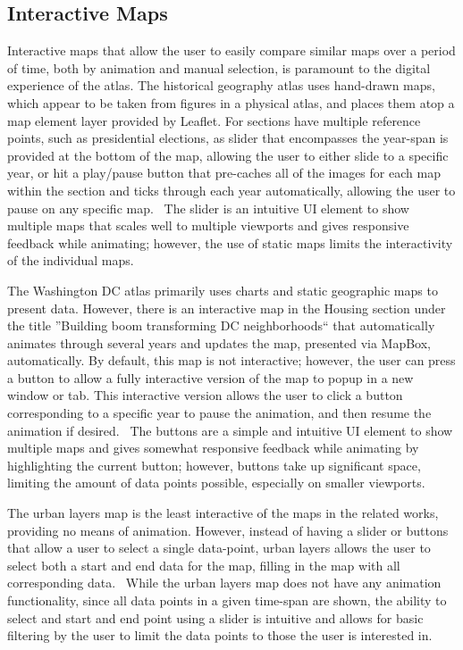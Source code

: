 \documentclass[11pt, draftcls, conference, onecolumn]{IEEEtran}
\begin{document}
\subsection{Interactive Maps}
Interactive maps that allow the user to easily compare similar maps over a period of time, both by animation and manual selection, is paramount to the digital experience of the atlas. The historical geography atlas uses hand-drawn maps, which appear to be taken from figures in a physical atlas, and places them atop a map element layer provided by Leaflet. For sections have multiple reference points, such as presidential elections, as slider that encompasses the year-span is provided at the bottom of the map, allowing the user to either slide to a specific year, or hit a play/pause button that pre-caches all of the images for each map within the section and ticks through each year automatically, allowing the user to pause on any specific map.~\cite{us-historical-atlas-2014} The slider is an intuitive UI element to show multiple maps that scales well to multiple viewports and gives responsive feedback while animating; however, the use of static maps limits the interactivity of the individual maps.

The Washington DC atlas primarily uses charts and static geographic maps to present data. However, there is an interactive map in the Housing section under the title ''Building boom transforming DC neighborhoods`` that automatically animates through several years and updates the map, presented via MapBox, automatically. By default, this map is not interactive; however, the user can press a button to allow a fully interactive version of the map to popup in a new window or tab. This interactive version allows the user to click a button corresponding to a specific year to pause the animation, and then resume the animation if desired.~\cite{dc-changing-2014} The buttons are a simple and intuitive UI element to show multiple maps and gives somewhat responsive feedback while animating by highlighting the current button; however, buttons take up significant space, limiting the amount of data points possible, especially on smaller viewports.

The urban layers map is the least interactive of the maps in the related works, providing no means of animation. However, instead of having a slider or buttons that allow a user to select a single data-point, urban layers allows the user to select both a start and end data for the map, filling in the map with all corresponding data.~\cite{urban-layers-2014} While the urban layers map does not have any animation functionality, since all data points in a given time-span are shown, the ability to select and start and end point using a slider is intuitive and allows for basic filtering by the user to limit the data points to those the user is interested in.
\end{document}
